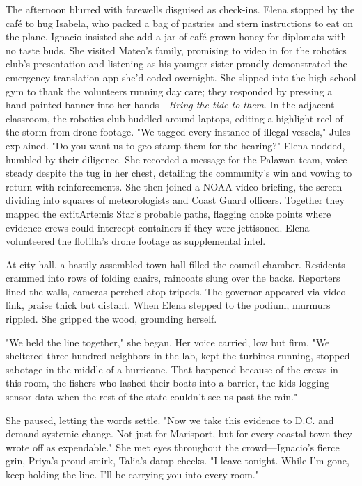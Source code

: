 \bigskip

The afternoon blurred with farewells disguised as check-ins. Elena stopped by the café to hug Isabela, who packed a bag of pastries and stern instructions to eat on the plane. Ignacio insisted she add a jar of café-grown honey for diplomats with no taste buds. She visited Mateo's family, promising to video in for the robotics club's presentation and listening as his younger sister proudly demonstrated the emergency translation app she'd coded overnight. She slipped into the high school gym to thank the volunteers running day care; they responded by pressing a hand-painted banner into her hands—\textit{Bring the tide to them}. In the adjacent classroom, the robotics club huddled around laptops, editing a highlight reel of the storm from drone footage. "We tagged every instance of illegal vessels," Jules explained. "Do you want us to geo-stamp them for the hearing?" Elena nodded, humbled by their diligence. She recorded a message for the Palawan team, voice steady despite the tug in her chest, detailing the community's win and vowing to return with reinforcements. She then joined a NOAA video briefing, the screen dividing into squares of meteorologists and Coast Guard officers. Together they mapped the 	extit{Artemis Star}'s probable paths, flagging choke points where evidence crews could intercept containers if they were jettisoned. Elena volunteered the flotilla's drone footage as supplemental intel.

At city hall, a hastily assembled town hall filled the council chamber. Residents crammed into rows of folding chairs, raincoats slung over the backs. Reporters lined the walls, cameras perched atop tripods. The governor appeared via video link, praise thick but distant. When Elena stepped to the podium, murmurs rippled. She gripped the wood, grounding herself.

"We held the line together," she began. Her voice carried, low but firm. "We sheltered three hundred neighbors in the lab, kept the turbines running, stopped sabotage in the middle of a hurricane. That happened because of the crews in this room, the fishers who lashed their boats into a barrier, the kids logging sensor data when the rest of the state couldn't see us past the rain."

She paused, letting the words settle. "Now we take this evidence to D.C. and demand systemic change. Not just for Marisport, but for every coastal town they wrote off as expendable." She met eyes throughout the crowd—Ignacio's fierce grin, Priya's proud smirk, Talia's damp cheeks. "I leave tonight. While I'm gone, keep holding the line. I'll be carrying you into every room."

